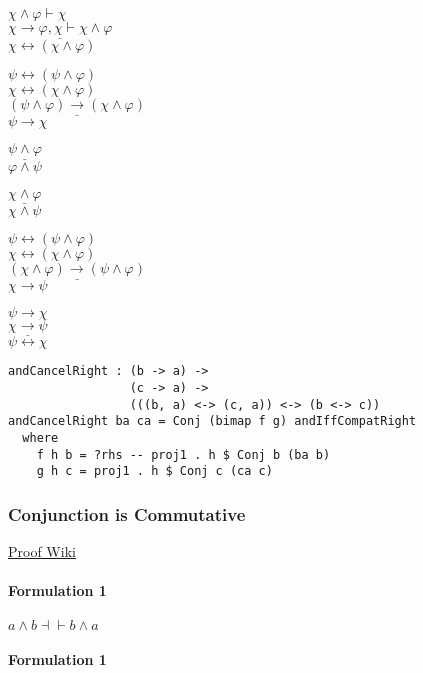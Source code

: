 \documentclass{acm_proc_article-sp}
\renewcommand{\iff}{\leftrightarrow}
\renewcommand{\implies}{\rightarrow}
\begin{document}
\(\chi \land \varphi \vdash \chi\)\\
\(\underline{\chi \implies \varphi, \chi \vdash \chi \land \varphi}\)\\
\(\chi \iff (\chi \land \varphi)\)

\(\psi \iff (\psi \land \varphi)\)\\
\(\chi \iff (\chi \land \varphi)\)\\
\(\underline{(\psi \land \varphi) \implies (\chi \land \varphi)}\)\\
\(\psi \implies \chi\)

\(\underline{\psi \land \varphi}\)\\
\(\varphi \land \psi\)

\(\underline{\chi \land \varphi}\)\\
\(\chi \land \psi\)

\(\psi \iff (\psi \land \varphi)\)\\
\(\chi \iff (\chi \land \varphi)\)\\
\(\underline{(\chi \land \varphi) \implies (\psi \land \varphi)}\)\\
\(\chi \implies \psi\)

\(\psi \implies \chi\)\\
\(\underline{\chi \implies \psi}\)\\
\(\psi \iff \chi\)

\begin{verbatim}
andCancelRight : (b -> a) ->
                 (c -> a) ->
                 (((b, a) <-> (c, a)) <-> (b <-> c))
andCancelRight ba ca = Conj (bimap f g) andIffCompatRight
  where
    f h b = ?rhs -- proj1 . h $ Conj b (ba b)
    g h c = proj1 . h $ Conj c (ca c)
\end{verbatim}

\subsubsection{Conjunction is
Commutative}\label{conjunction-is-commutative}

\href{https://proofwiki.org/wiki/Rule_of_Commutation/Conjunction}{Proof Wiki}

\paragraph{Formulation 1}\label{formulation-1}

\(a \land b \dashv\vdash b \land a\)

\paragraph{Formulation 1}\label{formulation-1-1}
\end{document}

